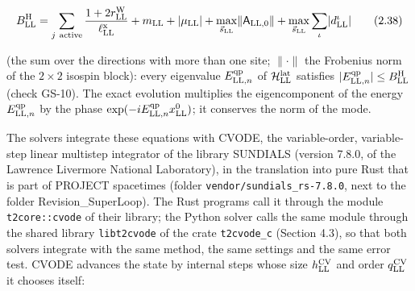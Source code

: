 \documentclass[
  10pt,
]{article}
\begin{document}
\[B^{\rm H}_{\rm LL}=\sum_{j\ \text{active}}\frac{1+2r^{\rm W}_{\rm LL}}{\ell^{\rm x}_{\rm LL}}+m_{\rm LL}+\lvert\mu_{\rm LL}\rvert+\max_{\vec s_{\rm LL}}\lVert\mathsf A_{{\rm LL},0}\rVert+\max_{\vec s_{\rm LL}}\sum_\iota\lvert d^\iota_{\rm LL}\rvert\tag{2.38}\]

(the sum over the directions with more than one site;
\(\lVert\cdot\rVert\) the Frobenius norm of the \(2\times2\) isospin
block): every eigenvalue \(E^{\rm qp}_{{\rm LL},n}\) of
\(\mathcal H^{\rm lat}_{\rm LL}\) satisfies
\(\lvert E^{\rm qp}_{{\rm LL},n}\rvert\le B^{\rm H}_{\rm LL}\) (check
GS-10). The exact evolution multiplies the eigencomponent of the energy
\(E^{\rm qp}_{{\rm LL},n}\) by the phase
\(\exp(-iE^{\rm qp}_{{\rm LL},n}x^0_{\rm LL})\); it conserves the norm
of the mode.

The solvers integrate these equations with CVODE, the variable-order,
variable-step linear multistep integrator of the library SUNDIALS
(version 7.8.0, of the Lawrence Livermore National Laboratory), in the
translation into pure Rust that is part of PROJECT spacetimes (folder
\texttt{vendor/sundials\_rs-7.8.0}, next to the folder
Revision\_SuperLoop). The Rust programs call it through the module
\texttt{t2core::cvode} of their library; the Python solver calls the
same module through the shared library \texttt{libt2cvode} of the crate
\texttt{t2cvode\_c} (Section 4.3), so that both solvers integrate with
the same method, the same settings and the same error test. CVODE
advances the state by internal steps whose size \(h^{\rm CV}_{\rm LL}\)
and order \(q^{\rm CV}_{\rm LL}\) it chooses itself:
\end{document}
